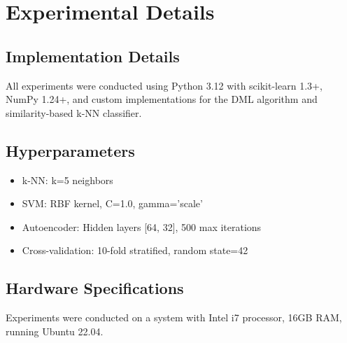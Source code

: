 \documentclass[12pt,a4paper]{article}
\begin{document}
\appendix

\section{Experimental Details}

\subsection{Implementation Details}
All experiments were conducted using Python 3.12 with scikit-learn 1.3+, NumPy 1.24+, and custom implementations for the DML algorithm and similarity-based k-NN classifier.

\subsection{Hyperparameters}
\begin{itemize}
    \item k-NN: k=5 neighbors
    \item SVM: RBF kernel, C=1.0, gamma='scale'
    \item Autoencoder: Hidden layers [64, 32], 500 max iterations
    \item Cross-validation: 10-fold stratified, random state=42
\end{itemize}

\subsection{Hardware Specifications}
Experiments were conducted on a system with Intel i7 processor, 16GB RAM, running Ubuntu 22.04.
\end{document}
